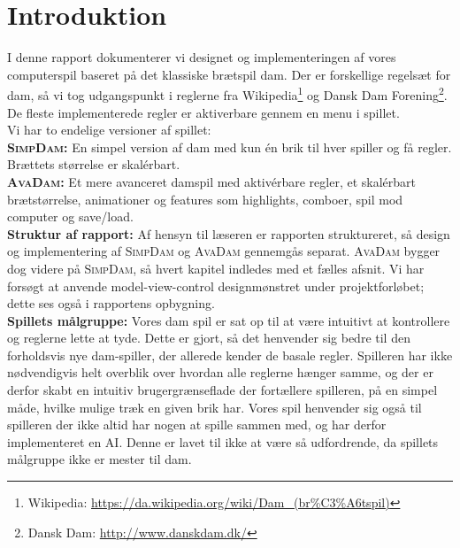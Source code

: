 \section{Introduktion}

I denne rapport dokumenterer vi designet og implementeringen af vores computerspil baseret på det klassiske brætspil dam. Der er forskellige regelsæt for dam, så vi tog udgangspunkt i reglerne fra Wikipedia\footnote{Wikipedia: \url{https://da.wikipedia.org/wiki/Dam_(br\%C3\%A6tspil)}} og Dansk Dam Forening\footnote{Dansk Dam:  \url{http://www.danskdam.dk/}}. De fleste implementerede regler er aktiverbare gennem en menu i spillet.\\

Vi har to endelige versioner af spillet: \\
\textbf{\textsc{SimpDam}:} En simpel version af dam med kun én brik til hver spiller og få regler. Brættets størrelse er skalérbart.\\

\textbf{\textsc{AvaDam}:} Et mere avanceret damspil med aktivérbare regler, et skalérbart brætstørrelse, animationer og features som highlights, comboer, spil mod computer og save/load.\\

\textbf{Struktur af rapport:} Af hensyn til læseren er rapporten struktureret, så design og implementering af \textsc{SimpDam} og \textsc{AvaDam} gennemgås separat. \textsc{AvaDam} bygger dog videre på \textsc{SimpDam}, så hvert kapitel indledes med et fælles afsnit. Vi har forsøgt at anvende model-view-control designmønstret under projektforløbet; dette ses også i rapportens opbygning. \\

\textbf{Spillets målgruppe:} Vores dam spil er sat op til at være intuitivt at kontrollere og reglerne lette at tyde. Dette er gjort, så det henvender sig bedre til den forholdsvis nye dam-spiller, der allerede kender de basale regler. Spilleren har ikke nødvendigvis helt overblik over hvordan alle reglerne hænger samme, og der er derfor skabt en intuitiv brugergrænseflade der fortællere spilleren, på en simpel måde, hvilke mulige træk en given brik har. Vores spil henvender sig også til spilleren der ikke altid har nogen at spille sammen med, og har derfor implementeret en AI. Denne er lavet til ikke at være så udfordrende, da spillets målgruppe ikke er mester til dam.
